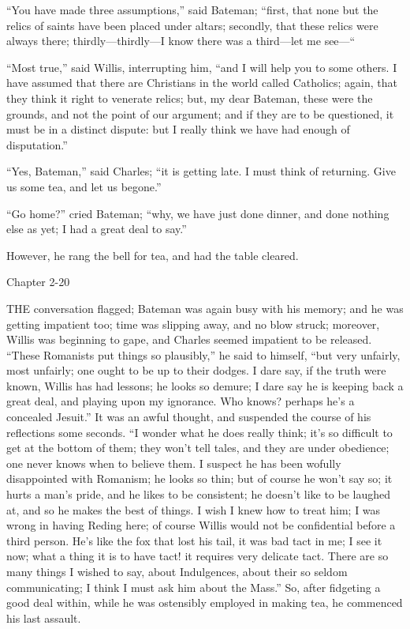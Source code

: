 ``You have made three assumptions,'' said Bateman; ``first,
that none but the relics of saints have been placed under altars;
secondly, that these relics were always there; thirdly—thirdly—I
know there was a third—let me see—``

``Most true,'' said Willis, interrupting him, ``and I
will help you to some others. I have assumed that there are Christians
in the world called Catholics; again, that they think it right to
venerate relics; but, my dear Bateman, these were the grounds, and not
the point of our argument; and if they are to be questioned, it must
be in a distinct dispute: but I really think we have had enough of
disputation.''

``Yes, Bateman,'' said Charles; ``it is getting late. I
must think of returning. Give us some tea, and let us begone.''

``Go home?'' cried Bateman; ``why, we have just done dinner, and done nothing else as yet; I had a great deal to
say.''

However, he rang the bell for tea, and had the table cleared.

Chapter 2-20


THE conversation flagged; Bateman was
again busy with his memory; and he was getting impatient too; time was
slipping away, and no blow struck; moreover, Willis was beginning to
gape, and Charles seemed impatient to be released. ``These
Romanists put things so plausibly,'' he said to himself, ``but
very unfairly, most unfairly; one ought to be up to their dodges. I
dare say, if the truth were known, Willis has had lessons; he looks so
demure; I dare say he is keeping back a great deal, and playing upon
my ignorance. Who knows? perhaps he's a concealed Jesuit.'' It was
an awful thought, and suspended the course of his reflections some
seconds. ``I wonder what he does really think; it's so difficult
to get at the bottom of them; they won't tell tales, and they are
under obedience; one never knows when to believe them. I suspect he
has been wofully disappointed with Romanism; he looks so thin; but of
course he won't say so; it hurts a man's pride, and he likes to be
consistent; he doesn't like to be laughed at, and so he makes the best
of things. I wish I knew how to treat him; I was wrong in having
Reding here; of course Willis would not be confidential before a
third person. He's like the fox that lost his tail, it was bad tact in
me; I see it now; what a thing it is to have tact! it requires very
delicate tact. There are so many things I wished to say, about
Indulgences, about their so seldom communicating; I think I must ask
him about the Mass.'' So, after fidgeting a good deal within,
while he was ostensibly employed in making tea, he commenced his last
assault.

